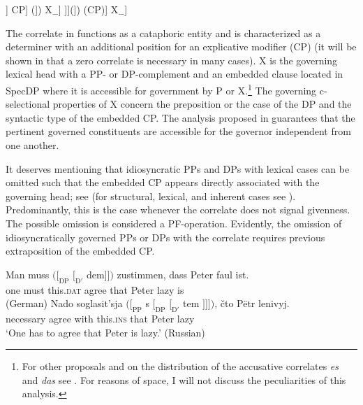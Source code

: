 \documentclass[output=paper,
colorlinks,
citecolor=brown,
newtxmath
]{langscibook}
\begin{document}
\ea\label{ex:7}
    \ea\label{ex:7a}
    \Big[\textsubscript{XP} X\textsubscript{\textalpha} (\big[\textsubscript{PP} P)\textsubscript{\textbeta} [\textsubscript{DP} [\textsubscript{D$'$} [\textsubscript{D} \big\{\{\textit{es}/\textit{das}\}, \textit{to}, $\varnothing$\big\}]] CP] (\big])\textsubscript{\textbeta} X\textsubscript{$-$\textalpha}\Big]
    \ex\label{ex:7b} \Big[\textsubscript{XP} X\textsubscript{\textalpha} (\big[\textsubscript{PP} P)\textsubscript{\textbeta} [\textsubscript{DP} [\textsubscript{DP} [\textsubscript{D$'$} [\textsubscript{D} \big\{\{\textit{es}/\textit{das}\}, \textit{ėto}\big\}]]](])\textsubscript{\textbeta} (CP)\big] X\textsubscript{$-$\textalpha}\Big]
\z\z

\noindent The correlate in  functions as a cataphoric entity and is characterized as a determiner with an additional position for an explicative modifier (CP) (it will be shown in  that a zero correlate is necessary in many cases).
X is the governing lexical head with a PP- or DP-complement and an embedded clause located in SpecDP where it is accessible for government by P or X.\footnote{For other proposals and on the distribution of the accusative correlates \textit{es} and \textit{das} see \citet{Axel-ToberHollerKrause2016}. For reasons of space, I will not discuss the peculiarities of this analysis.} The governing c-selectional properties of X concern the preposition or the case of the DP and the syntactic type of the embedded CP. The analysis proposed in  guarantees that the pertinent governed constituents are accessible for the governor independent from one another.

It deserves mentioning that idiosyncratic PPs and DPs with lexical cases can be omitted such that the embedded CP appears directly associated with the governing head; see  (for structural, lexical, and inherent cases see \citealt{SmirnovaJackendoff2017}). Predominantly, this is the case whenever the correlate does not signal givenness. The possible omission is considered a PF-operation. Evidently, the omission of idiosyncratically governed PPs or DPs with the correlate requires previous extraposition of the embedded CP.

    \largerpage[-1]

\ea\label{ex:8}
    \ea \gll Man muss $([_\textrm{DP}$ $[_{\textrm{D}'}$ dem$]])$ zustimmen, dass Peter faul ist.\\
    one must {} {} this.\textsc{dat} agree that Peter lazy is \\ \hfill (German)
    \ex \gll Nado soglasit’sja $([_\textrm{PP}$ s $[_\textrm{DP}$ $[_{\textrm{D}'}$ tem $]]])$, čto Pëtr lenivyj. \\
    necessary agree {} with {} {} this.\textsc{ins} {} that Peter lazy \\
    \z
    \glt `One has to agree that Peter is lazy.' \hfill (Russian)
\z
\end{document}
